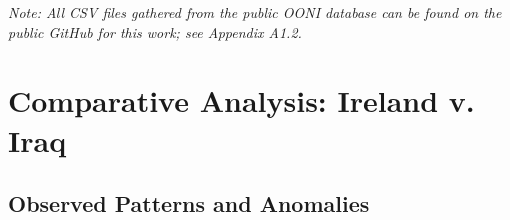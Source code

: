 \textit{Note: All CSV files gathered from the public OONI database can be found on the public GitHub for this work; see Appendix A1.2.}


\section{Comparative Analysis: Ireland v. Iraq}



\subsection{Observed Patterns and Anomalies}



